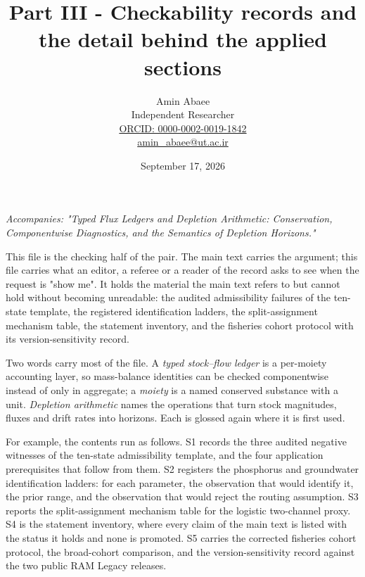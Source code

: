 \documentclass[11pt]{article}
\begin{document}
\title{Part III - Checkability records and the detail behind the applied sections}
\author{Amin Abaee\\[0.35em]
{\small Independent Researcher}\\[0.55em]
{\small\href{https://orcid.org/\allowbreak{}0000-0002-0019-1842}{ORCID: 0000-0002-0019-1842}}\\[0.3em]
{\small\href{mailto:amin\_abaee@ut.ac.ir}{amin\_abaee@ut.ac.ir}}}
\date{September 17, 2026}
\maketitle

\emph{Accompanies: "Typed Flux Ledgers and Depletion Arithmetic: Conservation, Componentwise Diagnostics, and the Semantics of Depletion Horizons."}

This file is the checking half of the pair. The main text carries the argument; this file carries what an editor, a referee or a reader of the record asks to see when the request is "show me". It holds the material the main text refers to but cannot hold without becoming unreadable: the audited admissibility failures of the ten-state template, the registered identification ladders, the split-assignment mechanism table, the statement inventory, and the fisheries cohort protocol with its version-sensitivity record.

Two words carry most of the file. A \emph{typed stock--flow ledger} is a per-moiety accounting layer, so mass-balance identities can be checked componentwise instead of only in aggregate; a \emph{moiety} is a named conserved substance with a unit. \emph{Depletion arithmetic} names the operations that turn stock magnitudes, fluxes and drift rates into horizons. Each is glossed again where it is first used.

For example, the contents run as follows. S1 records the three audited negative witnesses of the ten-state admissibility template, and the four application prerequisites that follow from them. S2 registers the phosphorus and groundwater identification ladders: for each parameter, the observation that would identify it, the prior range, and the observation that would reject the routing assumption. S3 reports the split-assignment mechanism table for the logistic two-channel proxy. S4 is the statement inventory, where every claim of the main text is listed with the status it holds and none is promoted. S5 carries the corrected fisheries cohort protocol, the broad-cohort comparison, and the version-sensitivity record against the two public RAM Legacy releases.
\end{document}
